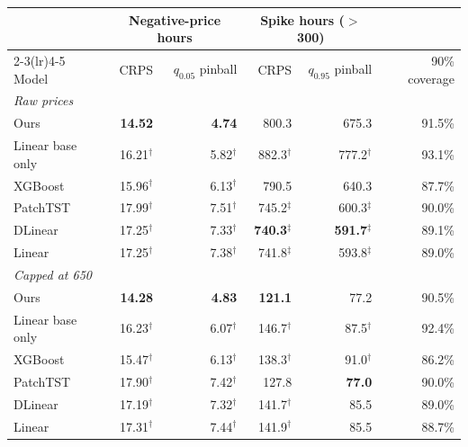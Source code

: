 \begin{tabular}{lrrrrr}
\toprule
& \multicolumn{2}{c}{Negative-price hours} & \multicolumn{2}{c}{Spike hours ($>$300)} & \\
\cmidrule(lr){2-3}\cmidrule(lr){4-5}
Model & CRPS & $q_{0.05}$ pinball & CRPS & $q_{0.95}$ pinball & 90\% coverage \\
\midrule
\multicolumn{6}{l}{\emph{Raw prices}} \\
Ours & \textbf{14.52} & \textbf{4.74} & 800.3 & 675.3 & 91.5\% \\
Linear base only & 16.21$^{\dagger}$ & 5.82$^{\dagger}$ & 882.3$^{\dagger}$ & 777.2$^{\dagger}$ & 93.1\% \\
XGBoost & 15.96$^{\dagger}$ & 6.13$^{\dagger}$ & 790.5 & 640.3 & 87.7\% \\
PatchTST & 17.99$^{\dagger}$ & 7.51$^{\dagger}$ & 745.2$^{\ddagger}$ & 600.3$^{\ddagger}$ & 90.0\% \\
DLinear & 17.25$^{\dagger}$ & 7.33$^{\dagger}$ & \textbf{740.3}$^{\ddagger}$ & \textbf{591.7}$^{\ddagger}$ & 89.1\% \\
Linear & 17.25$^{\dagger}$ & 7.38$^{\dagger}$ & 741.8$^{\ddagger}$ & 593.8$^{\ddagger}$ & 89.0\% \\
\midrule
\multicolumn{6}{l}{\emph{Capped at 650}} \\
Ours & \textbf{14.28} & \textbf{4.83} & \textbf{121.1} & 77.2 & 90.5\% \\
Linear base only & 16.23$^{\dagger}$ & 6.07$^{\dagger}$ & 146.7$^{\dagger}$ & 87.5$^{\dagger}$ & 92.4\% \\
XGBoost & 15.47$^{\dagger}$ & 6.13$^{\dagger}$ & 138.3$^{\dagger}$ & 91.0$^{\dagger}$ & 86.2\% \\
PatchTST & 17.90$^{\dagger}$ & 7.42$^{\dagger}$ & 127.8 & \textbf{77.0} & 90.0\% \\
DLinear & 17.19$^{\dagger}$ & 7.32$^{\dagger}$ & 141.7$^{\dagger}$ & 85.5 & 89.0\% \\
Linear & 17.31$^{\dagger}$ & 7.44$^{\dagger}$ & 141.9$^{\dagger}$ & 85.5 & 88.7\% \\
\bottomrule
\end{tabular}
